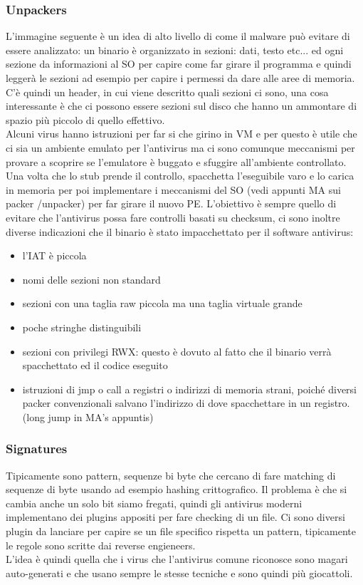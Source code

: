 \documentclass[12pt, oneside]{extbook} %
\begin{document}
\subsubsection{Unpackers}
L'immagine seguente è un idea di alto livello di come il malware può evitare di essere analizzato:
un binario è organizzato in sezioni: dati, testo etc... ed ogni sezione da informazioni al SO per capire come far girare il programma e quindi leggerà le sezioni ad esempio per capire i permessi da dare alle aree di memoria.\\C'è quindi un header, in cui viene descritto quali sezioni ci sono, una cosa interessante è che ci possono essere sezioni sul disco che hanno un ammontare di spazio più piccolo di quello effettivo.\\Alcuni virus hanno istruzioni per far si che girino in VM e per questo è utile che ci sia un ambiente emulato per l'antivirus ma ci sono comunque meccanismi per provare a scoprire se l'emulatore è buggato e sfuggire all'ambiente controllato.\\Una volta che lo stub prende il controllo, spacchetta l'eseguibile varo e lo carica in memoria per poi implementare i meccanismi del SO (vedi appunti MA sui packer /unpacker) per far girare il nuovo PE. L'obiettivo è sempre quello di evitare che l'antivirus possa fare controlli basati su checksum, ci sono inoltre diverse indicazioni che il binario è stato impacchettato per il software antivirus:
\begin{itemize}
\item l'IAT è piccola
\item nomi delle sezioni non standard
\item sezioni con una taglia raw piccola ma una taglia virtuale grande
\item poche stringhe distinguibili
\item sezioni con privilegi RWX: questo è dovuto al fatto che il binario verrà spacchettato ed il codice eseguito
\item istruzioni di jmp o call a registri o indirizzi di memoria strani, poiché diversi packer convenzionali salvano l'indirizzo di dove spacchettare in un registro. (long jump in MA's appuntis)
\end{itemize}
\subsubsection{Signatures}
Tipicamente sono pattern, sequenze bi byte che cercano di fare matching di sequenze di byte usando ad esempio hashing crittografico. Il problema è che si cambia anche un solo bit siamo fregati, quindi gli antivirus moderni implementano dei plugins appositi per fare checking di un file. Ci sono diversi plugin da lanciare per capire se un file specifico rispetta un pattern, tipicamente le regole sono scritte dai reverse engieneers.\\L'idea è quindi quella che i virus che l'antivirus comune riconosce sono magari auto-generati e che usano sempre le stesse tecniche e sono quindi più giocattoli.
\end{document}

